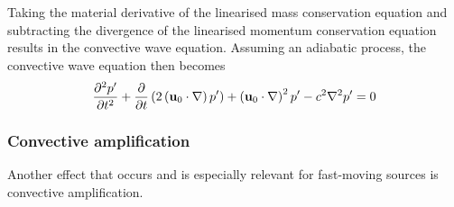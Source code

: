 Taking the material derivative of the linearised mass conservation equation and
subtracting the divergence of the linearised momentum conservation equation
results in the convective wave equation.
Assuming an adiabatic process, the convective wave equation then becomes
\begin{equation}
  \frac{\partial^2 p'}{\partial t^2} + \frac{\partial}{\partial t} \left( 2 \left( \mathbf{u}_0 \cdot \nabla \right) p' \right) + \left( \mathbf{u}_0 \cdot \nabla \right)^2 p' - c^2 \nabla^2 p' = 0
\end{equation}


\subsubsection{Convective amplification}
Another effect that occurs and is especially relevant for fast-moving sources is
convective amplification.

\cite{Dowling1976}


